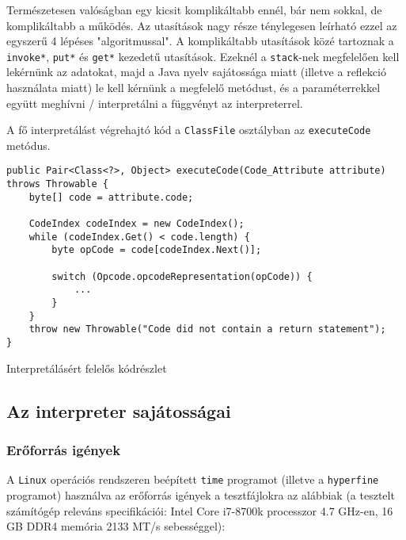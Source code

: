 Természetesen valóságban egy kicsit komplikáltabb ennél, bár nem sokkal, de komplikáltabb a működés. Az utasítások nagy része ténylegesen leírható ezzel az egyszerű 4 lépéses "algoritmussal". A komplikáltabb utasítások közé tartoznak a \lstinline{invoke*}, \lstinline{put*} és \lstinline{get*} kezedetű utasítások. Ezeknél a \lstinline{stack}-nek megfelelően kell lekérnünk az adatokat, majd a Java nyelv sajátossága miatt (illetve a reflekció használata miatt) le kell kérnünk a megfelelő metódust, és a paraméterrekkel együtt meghívni / interpretálni a függvényt az interpreterrel.

A fő interpretálást végrehajtó kód a \lstinline{ClassFile} osztályban az \lstinline{executeCode} metódus.

\begin{listing}[H]
\begin{verbatim}
public Pair<Class<?>, Object> executeCode(Code_Attribute attribute) throws Throwable {
	byte[] code = attribute.code;

	CodeIndex codeIndex = new CodeIndex();
	while (codeIndex.Get() < code.length) {
		byte opCode = code[codeIndex.Next()];

		switch (Opcode.opcodeRepresentation(opCode)) {
			...
		}
	}
	throw new Throwable("Code did not contain a return statement");
}
\end{verbatim}
\caption{Interpretálásért felelős kódrészlet}
\end{listing}

\subsection{Az interpreter sajátosságai}

\subsubsection{Erőforrás igények}

A \lstinline{Linux} operációs rendszeren beépített \lstinline{time} programot (illetve a \lstinline{hyperfine} programot) használva az erőforrás igények a tesztfájlokra az alábbiak (a tesztelt számítógép releváns specifikációi: Intel Core i7-8700k processzor 4.7 GHz-en, 16 GB DDR4 memória 2133 MT/s sebességgel):

